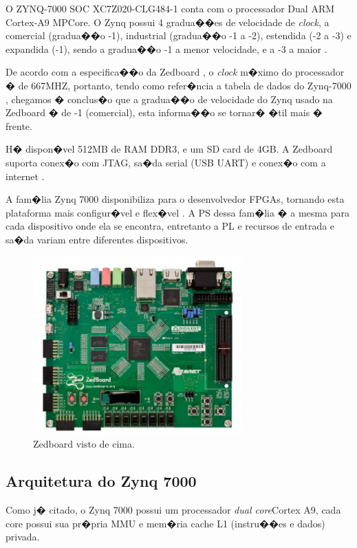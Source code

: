 \documentclass{ufscThesis/ufscThesis} %
\begin{document}
O ZYNQ-7000 SOC XC7Z020-CLG484-1 conta com o processador Dual ARM Cortex-A9 MPCore. O Zynq possui 4 gradua��es de velocidade de \emph{clock}, a comercial (gradua��o -1), industrial (gradua��o -1 a -2), estendida (-2 a -3) e expandida (-1), sendo a gradua��o -1 a menor velocidade, e a -3 a maior \cite{product_table}.

De acordo com a especifica��o da Zedboard \cite{zedboard}, o \emph{clock} m�ximo do processador � de 667MHZ, portanto, tendo como refer�ncia a tabela de dados do Zynq-7000 \cite[p.~13]{data_sheet}, chegamos � conclus�o que a gradua��o de velocidade do Zynq usado na Zedboard � de -1 (comercial), esta informa��o se tornar� �til mais � frente.

H� dispon�vel 512MB de RAM DDR3, e um SD card de 4GB. A Zedboard suporta conex�o com JTAG, sa�da serial (USB UART) e conex�o com a internet \cite{xilinx}.

A fam�lia Zynq 7000 disponibiliza para o desenvolvedor FPGAs, tornando esta plataforma mais configur�vel e flex�vel \cite[p.~26]{ug585}. A PS dessa fam�lia � a mesma para cada dispositivo onde ela se encontra, entretanto a PL e recursos de entrada e sa�da variam entre diferentes dispositivos. 


\begin{figure}[ht!]
    \centering
    \includegraphics[width=8cm]{figuras/zedboard}
    \caption{Zedboard visto de cima.}
\end{figure}

\subsection{Arquitetura do Zynq 7000}
Como j� citado, o Zynq 7000 possui um processador \emph{dual core}Cortex A9, cada core possui sua pr�pria MMU e mem�ria cache L1 (instru��es e dados) privada.

\end{document}
